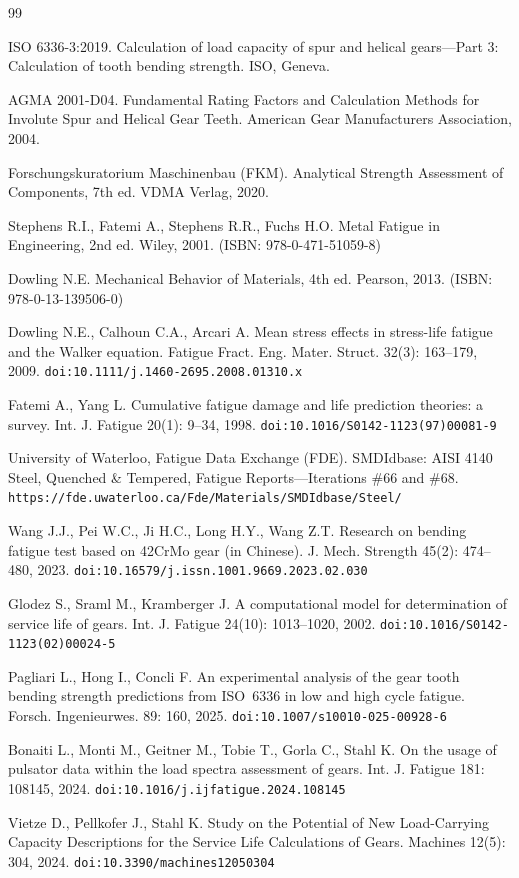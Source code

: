 \documentclass[12pt,a4paper]{article}
\begin{document}
\begin{thebibliography}{99}

ISO 6336-3:2019. Calculation of load capacity of spur and helical
gears---Part 3: Calculation of tooth bending strength. ISO, Geneva.

AGMA 2001-D04. Fundamental Rating Factors and Calculation Methods for
Involute Spur and Helical Gear Teeth. American Gear Manufacturers
Association, 2004.

Forschungskuratorium Maschinenbau (FKM). Analytical Strength Assessment
of Components, 7th ed. VDMA Verlag, 2020.

Stephens R.I., Fatemi A., Stephens R.R., Fuchs H.O. Metal Fatigue in
Engineering, 2nd ed. Wiley, 2001. (ISBN: 978-0-471-51059-8)

Dowling N.E. Mechanical Behavior of Materials, 4th ed. Pearson, 2013.
(ISBN: 978-0-13-139506-0)

Dowling N.E., Calhoun C.A., Arcari A. Mean stress effects in
stress-life fatigue and the Walker equation. Fatigue Fract. Eng. Mater.
Struct. 32(3): 163--179, 2009.
\texttt{doi:10.1111/j.1460-2695.2008.01310.x}

Fatemi A., Yang L. Cumulative fatigue damage and life prediction
theories: a survey. Int. J. Fatigue 20(1): 9--34, 1998.
\texttt{doi:10.1016/S0142-1123(97)00081-9}

University of Waterloo, Fatigue Data Exchange (FDE). SMDIdbase: AISI
4140 Steel, Quenched \& Tempered, Fatigue Reports---Iterations \#66 and
\#68. \texttt{https://fde.uwaterloo.ca/Fde/Materials/SMDIdbase/Steel/}

Wang J.J., Pei W.C., Ji H.C., Long H.Y., Wang Z.T. Research on bending
fatigue test based on 42CrMo gear (in Chinese). J. Mech. Strength
45(2): 474--480, 2023. \texttt{doi:10.16579/j.issn.1001.9669.2023.02.030}

Glodez S., Sraml M., Kramberger J. A computational model for
determination of service life of gears. Int. J. Fatigue 24(10):
1013--1020, 2002. \texttt{doi:10.1016/S0142-1123(02)00024-5}

Pagliari L., Hong I., Concli F. An experimental analysis of the gear
tooth bending strength predictions from ISO~6336 in low and high cycle
fatigue. Forsch. Ingenieurwes. 89: 160, 2025.
\texttt{doi:10.1007/s10010-025-00928-6}

Bonaiti L., Monti M., Geitner M., Tobie T., Gorla C., Stahl K.
On the usage of pulsator data within the load spectra assessment of
gears. Int. J. Fatigue 181: 108145, 2024.
\texttt{doi:10.1016/j.ijfatigue.2024.108145}

Vietze D., Pellkofer J., Stahl K. Study on the Potential of New
Load-Carrying Capacity Descriptions for the Service Life Calculations
of Gears. Machines 12(5): 304, 2024.
\texttt{doi:10.3390/machines12050304}

\end{thebibliography}
\end{document}
